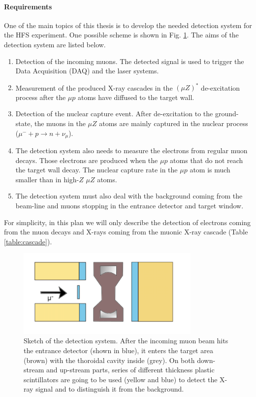 \documentclass[12pt]{article}
\begin{document}
\paragraph{Requirements}
One of the main topics of this thesis is to develop the needed detection system for the HFS experiment. One possible scheme is shown in Fig. \ref{fig:setup}. The aims of the detection system are listed below.
\begin{enumerate}
\item
	Detection of the incoming muons. The detected signal is used to trigger the Data Acquisition (DAQ) and the laser systems. 
\item
	Measurement of the produced X-ray cascades in the $({\mu}Z)^*$ de-excitation process after the ${\mu}p$ atoms have diffused to the target wall.
\item
	Detection of the nuclear capture event. After de-excitation to the ground-state, the muons in the ${\mu}Z$ atoms are mainly captured in the nuclear process (${\mu}^- + p \rightarrow n + {\nu}_{\mu}$).
\item
	The detection system also needs to measure the electrons from regular muon decays. Those electrons are produced when the ${\mu}p$ atoms that do not reach the target wall decay. The nuclear capture rate in the ${\mu}p$ atom is much smaller than in high-$Z$ ${\mu}Z$ atoms. 
\item
	The detection system must also deal with the background coming from the beam-line and muons stopping in the entrance detector and target window.
\end{enumerate}
For simplicity, in this plan we will only describe the detection of electrons coming from the muon decays and X-rays coming from the muonic X-ray cascade (Table \ref{table:cascade}).
\begin{figure}[!htbp]
\centering
\includegraphics[width=0.8\textwidth]{img/setup2.png}
\caption{Sketch of the detection system. After the incoming muon beam hits the entrance detector (shown in blue), it enters the target area (brown) with the thoroidal cavity inside (grey). On both down-stream and up-stream parts, series of different thickness plastic scintillators are going to be used (yellow and blue) to detect the X-ray signal and to distinguish it from the background.}
\label{fig:setup}
\end{figure}
\end{document}
